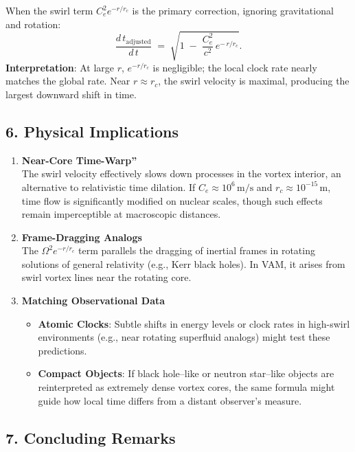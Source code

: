 When the swirl term \(C_e^2 e^{-r/r_c}\) is the primary correction, ignoring gravitational and rotation:
\[
    \frac{d\,t_\text{adjusted}}{d\,t}
    \;=\;
    \sqrt{
        1
        \;-\;
        \frac{C_e^2}{c^2}\, e^{-\,r/r_c}
    }.
\]
\textbf{Interpretation}: At large \(r\), \(e^{-r/r_c}\) is negligible; the local clock rate nearly matches the global rate. Near \(r\approx r_c\), the swirl velocity is maximal, producing the largest downward shift in time.

\subsection*{6. Physical Implications}

\begin{enumerate}
    \item \textbf{Near-Core \grqq Time-Warp\textquotedblright} \\
    The swirl velocity effectively slows down processes in the vortex interior, an alternative to relativistic time dilation. If \(C_e\approx 10^6\,\text{m/s}\) and \(r_c\approx 10^{-15}\,\text{m}\), time flow is significantly modified on nuclear scales, though such effects remain imperceptible at macroscopic distances.
    \item \textbf{Frame-Dragging Analogs} \\
    The \(\Omega^2 e^{-r/r_c}\) term parallels the dragging of inertial frames in rotating solutions of general relativity (e.g., Kerr black holes). In VAM, it arises from swirl vortex lines near the rotating core.
    \item \textbf{Matching Observational Data} \\
    \begin{itemize}
        \item \textbf{Atomic Clocks}: Subtle shifts in energy levels or clock rates in high-swirl environments (e.g., near rotating superfluid analogs) might test these predictions.
        \item \textbf{Compact Objects}: If black hole–like or neutron star–like objects are reinterpreted as extremely dense vortex cores, the same formula might guide how local time differs from a distant observer's measure.
    \end{itemize}
\end{enumerate}

\subsection*{7. Concluding Remarks}

